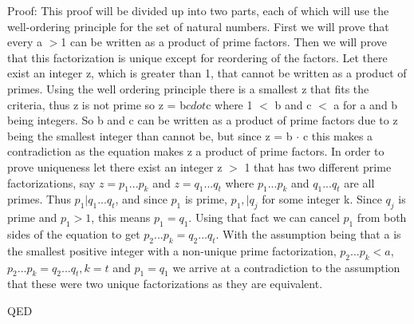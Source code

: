\documentclass{article}
\begin{document}
Proof: This proof will be divided up into two parts, each of which will use the well-ordering principle for the set of natural numbers. First we will prove that every a $>$1 can be written as a product of prime factors. Then we will prove that this factorization is unique except for reordering of the factors. Let there exist an integer z, which is greater than 1, that cannot be written as a product of primes. Using the well ordering principle there is a smallest z that fits the criteria, thus z is not prime so z = b$cdot$c where 1 $<$ b and c $<$ a for a and b being integers. So b and c can be written as a product of prime factors due to z being the smallest integer than cannot be, but since z = b $\cdot$ c this makes a contradiction as the equation makes z a product of prime factors. In order to prove uniqueness let there exist an integer z $>$ 1 that has two different prime factorizations, say $z = p_1 ... p_k$  and $z = q_1 ... q_t$ where $p_1 ... p_k$ and $q_1 ... q_t$ are all primes. Thus $p_1 \vert q_1...q_t$, and since $p_1$ is prime, $p_1, \vert q_j$ for some integer k. Since $q_j$ is prime and $p_1 >1$, this means $p_1 = q_1$. Using that fact we can cancel $p_1$ from both sides of the equation to get $p_2...p_k = q_2...q_t$. With the assumption being that a is the smallest positive integer with a non-unique prime factorization, $p_2...p_k < a$, $p_2...p_k = q_2... q_t, k = t$ and $p_1 = q_1$ we arrive at a contradiction to the assumption that these were two unique factorizations as they are equivalent.

QED 
\end{document}
